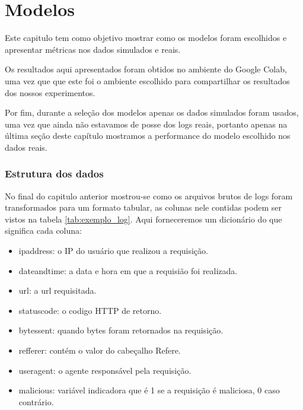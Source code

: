
\chapter{Modelos}
\label{cap:models}

Este capitulo tem como objetivo mostrar como os modelos foram escolhidos e apresentar
métricas nos dados simulados e reais.

Os resultados aqui apresentados foram obtidos no ambiente do Google Colab, uma vez que 
que este foi o ambiente escolhido para compartilhar os resultados dos nossos experimentos. 

Por fim, durante a seleção dos modelos apenas os dados simulados foram usados, uma vez
que ainda não estavamos de posse dos logs reais, portanto apenas na última seção deste capítulo
mostramos a performance do modelo escolhido nos dados reais.


\subsection{Estrutura dos dados}

No final do capitulo anterior mostrou-se como os arquivos brutos de logs foram transformados
para um formato tabular, as colunas nele contidas podem ser vistos na tabela \ref{tab:exemplo_log}. 
Aqui forneceremos um dicionário do que significa cada coluna:


\begin{itemize}
    \item ipaddress: o IP do usuário que realizou a requisição.
    \item dateandtime: a data e hora em que a requisião foi realizada.
    \item url: a url requisitada.
    \item statuscode: o codigo HTTP de retorno.
    \item bytessent: quando bytes foram retornados na requisição.
    \item refferer: contém o valor do cabeçalho Refere.
    \item useragent: o agente responsável pela requisição.
    \item malicious: variável indicadora que é 1 se a requisição é maliciosa, 0 caso contrário.
\end{itemize}


